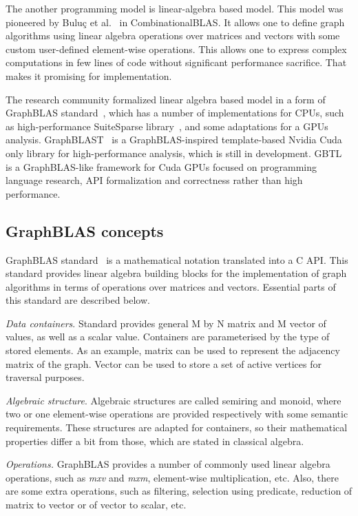 The another programming model is linear-algebra based model. This model was pioneered by Buluç et al.~\cite{article:combblas} in CombinationalBLAS. It allows one to define graph algorithms using linear algebra operations over matrices and vectors with some custom user-defined element-wise operations. This allows one to express complex computations in few lines of code without significant performance sacrifice. That makes it promising for implementation. 

The research community formalized linear algebra based model in a form of GraphBLAS standard~\cite{7761646}, which has a number of implementations for CPUs, such as high-performance SuiteSparse library~\cite{10.1145/3322125}, and some adaptations for a GPUs analysis. GraphBLAST~\cite{yang2019graphblast} is a GraphBLAS-inspired template-based Nvidia Cuda only library for high-performance analysis, which is still in development.
GBTL~\cite{7529957} is a GraphBLAS-like framework for Cuda GPUs focused on programming language research, API formalization and correctness rather than high performance. 

\subsection{GraphBLAS concepts}

GraphBLAS standard~\cite{7761646} is a mathematical notation translated into a C API. This standard provides linear algebra building blocks for the implementation of graph algorithms in terms of operations over matrices and vectors. Essential parts of this standard are described below.

\textit{Data containers}. Standard provides general M by N matrix and M vector of values, as well as a scalar value. Containers are parameterised by the type of stored elements. As an example, matrix can be used to represent the adjacency matrix of the graph. Vector can be used to store a set of active vertices for traversal purposes. 

\textit{Algebraic structure}. Algebraic structures are called semiring and monoid, where two or one element-wise operations are provided respectively with some semantic requirements. These structures are adapted for containers, so their mathematical properties differ a bit from those, which are stated in classical algebra.

\textit{Operations.} GraphBLAS provides a number of commonly used linear algebra operations, such as \textit{mxv} and \textit{mxm}, element-wise multiplication, etc. Also, there are some extra operations, such as filtering, selection using predicate, reduction of matrix to vector or of vector to scalar, etc.


